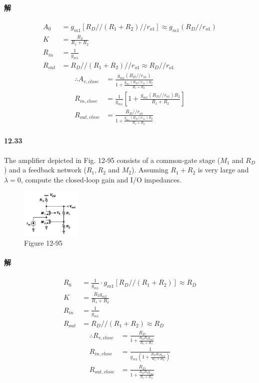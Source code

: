 \documentclass[hyperref, UTF8]{ctexart}
\newcommand{\under}[1]{\frac{1}{#1}}
\begin{document}
\paragraph{解}
    \begin{align*}
        A_0 & = g_{m1}[R_D // (R_1+R_2) // r_{o1}] \approx g_{m1}(R_D // r_{o1}) \\
        K & = \frac{R_2}{R_1+R_2} \\
        R_{in} & = \under{g_{m1}} \\
        R_{out} & = R_D // (R_1+R_2) // r_{o1} \approx R_D // r_{o1} 
    \end{align*}
    \begin{align*}
        \therefore A_{v, close} & = \frac{g_{m1}(R_D // r_{o1})}{1+\frac{g_{m1}(R_D // r_{o1})R_2}{R_1+R_2}} \\
        R_{in,close} & = \under{g_{m1}}\left[1+\frac{g_{m1}(R_D // r_{o1})R_2}{R_1+R_2}\right] \\
        R_{out,close} & = \frac{R_D // r_{o1}}{1+\frac{g_{m1}(R_D // r_{o1})R_2}{R_1+R_2}}
    \end{align*}
\paragraph{12.33} \label{12.33}
    The amplifier depicted in Fig. 12-95 consists of a common-gate stage ($M_1$ and $R_D$) and a feedback network ($R_1, R_2$ and $M_2$). Assuming $R_1+R_2$ is very large and $\lambda = 0$, compute the closed-loop gain and I/O impedances.
    \begin{figure}[!htb]
        \centering
        \includegraphics[width=0.254\textwidth]{p12-95.png}
        \caption*{Figure 12-95}
    \end{figure}        
\paragraph{解}
    \begin{align*}
        R_0 & = \under{g_{m1}} \cdot g_{m1}[R_D // (R_1+R_2)] \approx R_D\\
        K & = \frac{R_2g_{m2}}{R_1+R_2} \\
        R_{in} & = \under{g_{m1}} \\
        R_{out} & = R_D // (R_1+R_2) \approx R_D 
    \end{align*}
    \begin{align*}
        \therefore R_{v, close} & = \frac{R_D}{1+\frac{R_DR_2g_{m2}}{R_1+R_2}} \\
        R_{in,close} & = \under{g_{m1}\left(1+\frac{R_DR_2g_{m2}}{R_1+R_2}\right)} \\
        R_{out,close} & = \frac{R_D}{1+\frac{R_DR_2g_{m2}}{R_1+R_2}}
    \end{align*}
\end{document}
